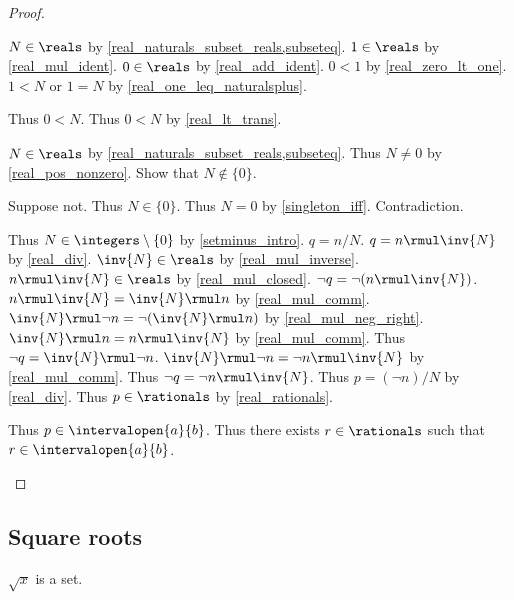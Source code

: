 \begin{proof}
\begin{byCase}
\begin{subproof}
\begin{subproof}
                $N\in\reals$ by \cref{real_naturals_subset_reals,subseteq}.
                $1\in\reals$ by \cref{real_mul_ident}.
                $0\in\reals$ by \cref{real_add_ident}.
                $0 < 1$ by \cref{real_zero_lt_one}.
                $1 < N$ or $1 = N$ by \cref{real_one_leq_naturalsplus}.
                \begin{byCase}
                    Thus $0 < N$.
                    Thus $0 < N$ by \cref{real_lt_trans}.
                \end{byCase}
            \end{subproof}
            $N\in\reals$ by \cref{real_naturals_subset_reals,subseteq}.
            Thus $N\neq 0$ by \cref{real_pos_nonzero}.
            Show that $N\notin\{0\}$.
            \begin{subproof}
                Suppose not.
                Thus $N\in\{0\}$.
                Thus $N = 0$ by \cref{singleton_iff}.
                Contradiction.
            \end{subproof}
            Thus $N\in\integers\setminus\{0\}$ by \cref{setminus_intro}.
            $q = n / N$.
            $q = n \rmul \inv{N}$ by \cref{real_div}.
            $\inv{N}\in\reals$ by \cref{real_mul_inverse}.
            $n \rmul \inv{N}\in\reals$ by \cref{real_mul_closed}.
            $\neg{q} = \neg{(n \rmul \inv{N})}$.
            $n \rmul \inv{N} = \inv{N} \rmul n$ by \cref{real_mul_comm}.
            $\inv{N} \rmul \neg{n} = \neg{(\inv{N} \rmul n)}$ by \cref{real_mul_neg_right}.
            $\inv{N} \rmul n = n \rmul \inv{N}$ by \cref{real_mul_comm}.
            Thus $\neg{q} = \inv{N} \rmul \neg{n}$.
            $\inv{N} \rmul \neg{n} = \neg{n} \rmul \inv{N}$ by \cref{real_mul_comm}.
            Thus $\neg{q} = \neg{n} \rmul \inv{N}$.
            Thus $p = (\neg{n}) / N$ by \cref{real_div}.
            Thus $p\in\rationals$ by \cref{real_rationals}.
        \end{subproof}
        Thus $p\in\intervalopen{a}{b}$.
        Thus there exists $r\in\rationals$ such that $r\in\intervalopen{a}{b}$.
    \end{byCase}
\end{proof}

\subsection{Square roots}

\begin{signature} \label{sig9}
    $\sqrt{x}$ is a set.
\end{signature}

